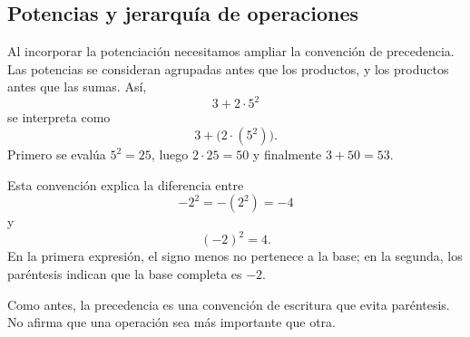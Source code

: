 \subsection{Potencias y jerarquía de operaciones}

Al incorporar la potenciación necesitamos ampliar la convención de precedencia. Las potencias se consideran agrupadas antes que los productos, y los productos antes que las sumas. Así,
\[
3+2\cdot5^2
\]
se interpreta como
\[
3+\bigl(2\cdot(5^2)\bigr).
\]
Primero se evalúa \(5^2=25\), luego \(2\cdot25=50\) y finalmente \(3+50=53\).

Esta convención explica la diferencia entre
\[
-2^2=-(2^2)=-4
\]
y
\[
(-2)^2=4.
\]
En la primera expresión, el signo menos no pertenece a la base; en la segunda, los paréntesis indican que la base completa es \(-2\).

Como antes, la precedencia es una convención de escritura que evita paréntesis. No afirma que una operación sea más importante que otra.
